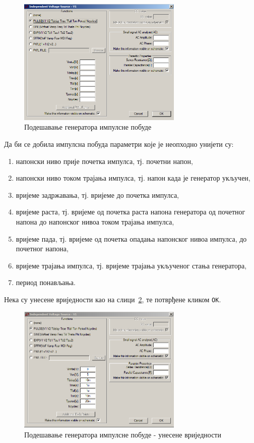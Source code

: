 \begin{figure}[h]
\centering
\includegraphics[width=0.7\textwidth]{figs/rc-t2.PNG}
\caption{Подешавање генератора импулсне побуде}
\label{Fig:rc-t2}
\end{figure}

Да би се добила импулсна побуда параметри које је неопходно унијети су:
\begin{enumerate}
\item напонски ниво прије почетка импулса, тј. почетни напон,
\item напонски ниво током трајања импулса, тј. напон када је генератор укључен,
\item вријеме задржавања, тј. вријеме до почетка импулса,
\item вријеме раста, тј. вријеме од почетка раста напона генератора од почетног напона до напонског нивоа током трајања импулса,
\item вријеме пада, тј. вријеме од почетка опадања напонског нивоа импулса, до почетног напона,
\item вријеме трајања импулса, тј. вријеме трајања укљученог стања генератора,
\item период понављања.
\end{enumerate}

Нека су унесене вриједности као на слици~\ref{Fig:rc-t3}, те потврђене кликом \texttt{OK}.

\begin{figure}[h]
\centering
\includegraphics[width=0.7\textwidth]{figs/rc-t3.PNG}
\caption{Подешавање генератора импулсне побуде - унесене вриједности}
\label{Fig:rc-t3}
\end{figure}

